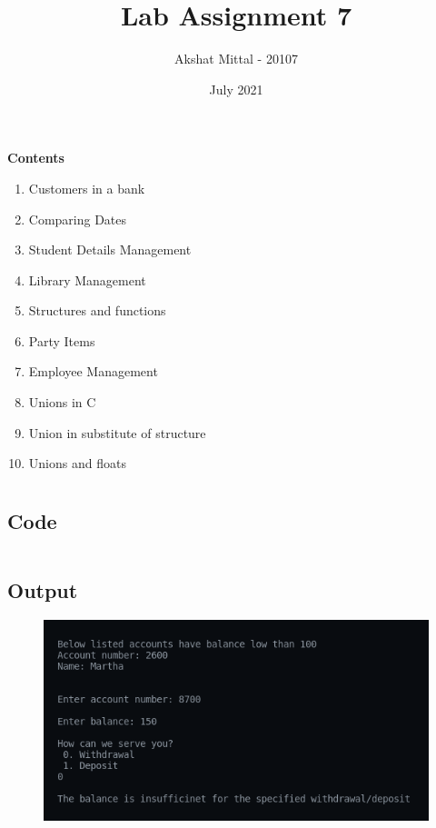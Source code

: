 \documentclass[12pt]{article}
\title{Lab Assignment 7}
\author{Akshat Mittal - 20107}
\date{July 2021}
\begin{document}
\maketitle
\vspace{7mm}
\textbf{Contents}
\vspace{7mm}
\begin{enumerate}
    \item Customers in a bank
    \item Comparing Dates
    \item Student Details Management
    \item Library Management
    \item Structures and functions
    \item Party Items
    \item Employee Management
    \item Unions in C
    \item Union in substitute of structure
    \item Unions and floats
\end{enumerate}

\newpage
\section{}
\subsection{Code}
\inputminted{c}{q1.c}
\subsection{Output}
\begin{figure}[h]
    \centering
    \includegraphics[width=1\textwidth]{1.png}
\end{figure}

\newpage
\end{document}
